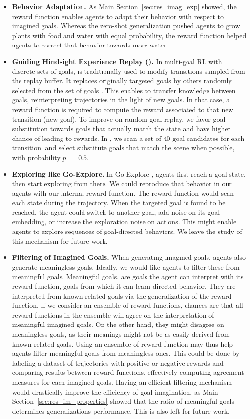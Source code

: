 \begin{itemize}
    \item
    \textbf{Behavior Adaptation.} As Main Section~\ref{sec:res_imag_exp} showed, the reward function enables agents to adapt their behavior with respect to imagined goals. Whereas the zero-shot generalization pushed agents to grow plants with food and water with equal probability, the reward function helped agents to correct that behavior towards more water.
    \item 
    \textbf{Guiding Hindsight Experience Replay (\her).} In multi-goal RL with discrete sets of goals, \her is traditionally used to modify transitions sampled from the replay buffer. It replaces originally targeted goals by others randomly selected from the set of goals \cite{andrychowicz2017hindsight,unicorn}. This enables to transfer knowledge between goals, reinterpreting trajectories in the light of new goals. In that case, a reward function is required to compute the reward associated to that new transition (new goal). To improve on random goal replay, we favor goal substitution towards goals that actually match the state and have higher chance of leading to rewards. In \imagine, we scan a set of $40$ goal candidates for each transition, and select substitute goals that match the scene when possible, with probability $p~=~0.5$.
    \item 
    \textbf{Exploring like Go-Explore.} In Go-Explore \cite{ecoffet2019go}, agents first reach a goal state, then start exploring from there. We could reproduce that behavior in our \imagine agents with our internal reward function. The reward function would scan each state during the trajectory. When the targeted goal is found to be reached, the agent could switch to another goal, add noise on its goal embedding, or increase the exploration noise on actions. This might enable agents to explore sequences of goal-directed behaviors. We leave the study of this mechanism for future work.
    \item 
    \textbf{Filtering of Imagined Goals.} When generating imagined goals, agents also generate meaningless goals. Ideally, we would like agents to filter these from meaningful goals. Meaningful goals, are goals the agent can interpret with its reward function, goals from which it can learn directed behavior. They are interpreted from known related goals via the generalization of the reward function. If we consider an ensemble of reward functions, chances are that all reward functions in the ensemble will agree on the interpretation of meaningful imagined goals. On the other hand, they might disagree on meaningless goals, as their meanings might not be as easily derived from known related goals. Using an ensemble of reward function may thus help agents filter meaningful goals from meaningless ones. This could be done by labeling a dataset of trajectories with positive or negative rewards and comparing results between reward functions, effectively computing agreement measures for each imagined goals. Having an efficient filtering mechanism would drastically improve the efficiency of goal imagination, as Main Section~\ref{sec:res_im_properties} showed that the ratio of meaningful goals determines generalizations performance. This is also left for future work.

\end{itemize}
